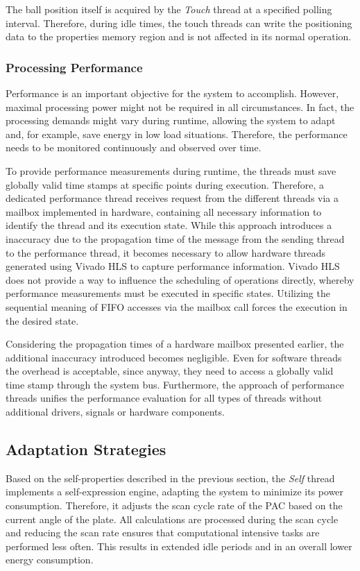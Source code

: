 The ball position itself is acquired by the \emph{Touch} thread at a specified
polling interval. Therefore, during idle times, the touch threads can write
the positioning data to the properties memory region and is not affected in
its normal operation.

\subsubsection{Processing Performance}
\label{sssec:processing}
Performance is an important objective for the system to accomplish. However,
maximal processing power might not be required in all circumstances. In fact,
the processing demands might vary during runtime, allowing the system to adapt
and, for example, save energy in low load situations. Therefore, the
performance needs to be monitored continuously and observed over time.

To provide performance measurements during runtime, the threads must save
globally valid time stamps at specific points during execution. Therefore, a
dedicated performance thread receives request from the different threads via a
mailbox implemented in hardware, containing all necessary information to
identify the thread and its execution state. While this approach introduces a
inaccuracy due to the propagation time of the message from the sending thread
to the performance thread, it becomes necessary to allow hardware threads
generated using Vivado HLS to capture performance information. Vivado HLS does
not provide a way to influence the scheduling of operations directly, whereby
performance measurements must be executed in specific states. Utilizing the
sequential meaning of \ac{FIFO} accesses via the mailbox call forces the execution in the desired state.

Considering the propagation times of a hardware mailbox presented earlier, the
additional inaccuracy introduced becomes negligible. Even for software threads
the overhead is acceptable, since anyway, they need to access a globally valid
time stamp through the system bus. Furthermore, the approach of performance
threads unifies the performance evaluation for all types of threads without
additional drivers, signals or hardware components.

\subsection{Adaptation Strategies}
Based on the self-properties described in the previous section, the
\emph{Self} thread implements a self-expression engine, adapting the system to
minimize its power consumption. Therefore, it adjusts the scan cycle rate of
the \ac{PAC} based on the current angle of the plate. All calculations are
processed during the scan cycle and reducing the scan rate ensures that
computational intensive tasks are performed less often. This results in
extended idle periods and in an overall lower energy consumption.

